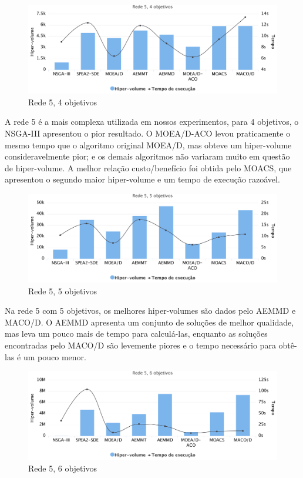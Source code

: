 \begin{figure}[!htbp]
	\caption{Rede 5, 4 objetivos}
	\label{fig_exp4_r5o4}
	\includegraphics[width=1\textwidth]{cap_experimentos/figs/etapa4/r5o4}
\end{figure}

A rede 5 é a mais complexa utilizada em nossos experimentos, para 4 objetivos, o NSGA-III apresentou o pior resultado. O MOEA/D-ACO levou praticamente o mesmo tempo que o algoritmo original MOEA/D, mas obteve um hiper-volume consideravelmente pior; e os demais algoritmos não variaram muito em questão de hiper-volume. A melhor relação custo/benefício foi obtida pelo MOACS, que apresentou o segundo maior hiper-volume e um tempo de execução razoável.

\begin{figure}[!htbp]
	\caption{Rede 5, 5 objetivos}
	\label{fig_exp4_r5o5}
	\includegraphics[width=1\textwidth]{cap_experimentos/figs/etapa4/r5o5}
\end{figure}

Na rede 5 com 5 objetivos, os melhores hiper-volumes são dados pelo AEMMD e MACO/D. O AEMMD apresenta um conjunto de soluções de melhor qualidade, mas leva um pouco mais de tempo para calculá-las, enquanto as soluções encontradas pelo MACO/D são levemente piores e o tempo necessário para obtê-las é um pouco menor.

\begin{figure}[!htbp]
	\caption{Rede 5, 6 objetivos}
	\label{fig_exp4_r5o6}
	\includegraphics[width=1\textwidth]{cap_experimentos/figs/etapa4/r5o6}
\end{figure}

